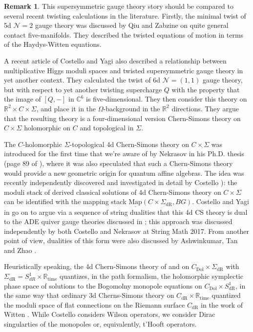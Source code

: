 \documentclass[11pt, oneside, reqno]{amsart}
\theoremstyle{definition} \newtheorem{definition}{Definition}[section]
\theoremstyle{definition} \newtheorem{remark}[definition]{Remark}
\theoremstyle{definition} \newtheorem{remarks}[definition]{Remarks}
\theoremstyle{definition} \newtheorem{question}[definition]{Question}
\theoremstyle{definition} \newtheorem*{note}{Note}
\theoremstyle{definition} \newtheorem{example}[definition]{Example}
\theoremstyle{definition} \newtheorem{examples}[definition]{Examples}
\newcommand{\mr}[1]{\mathrm{#1}}
\newcommand{\mc}[1]{\mathcal{#1}}
\newcommand{\ul}[1]{\underline{#1}}
\newcommand{\CC}{\mathbb{C}}
\newcommand{\RR}{\mathbb{R}}
\newcommand{\map}{\ul{\mr{Map}}}
\begin{document}
\begin{remark} \label{Kapustin_twist_remark}
This supersymmetric gauge theory story should be compared to several recent twisting calculations in the literature.  Firstly, the minimal twist of 5d $\mc N=2$ gauge theory was discussed by Qiu and Zabzine \cite{QiuZabzine} on quite general contact five-manifolds.  They described the twisted equations of motion in terms of the Haydys-Witten equations.

A recent article of Costello and Yagi \cite{CostelloYagi} also described a relationship between multiplicative Higgs moduli spaces and twisted supersymmetric gauge theory in yet another context.  They calculated the twist of 6d $\mc N=(1,1)$ gauge theory, but with respect to yet another twisting supercharge $Q$ with the property that the image of $[Q,-]$ in $\CC^6$ is five-dimensional.  They then consider this theory on $\RR^2 \times C \times \Sigma$, and place it in the $\Omega$-background in the $\RR^2$ directions.  They argue that the resulting theory is a four-dimensional version Chern-Simons theory on $C \times \Sigma$ holomorphic on $C$ and topological in $\Sigma$.

The $C$-holomorphic $\Sigma$-topological 4d Chern-Simons theory on $C \times \Sigma$  was introduced for the first time that we're aware of by Nekrasov in his Ph.D. thesis (page 89 of \cite{NekrasovThesis}), where it was also speculated that such a Chern-Simons theory
would provide a new geometric origin for quantum affine algebras. The idea was recently independently discovered and investigated in detail by Costello \cite{CostelloYangian}): the moduli stack of derived classical solutions of 4d Chern-Simons theory on $C \times \Sigma$ can be identified with the mapping stack $\map(C \times \Sigma_{\mr{dR}}, BG)$. Costello and Yagi in \cite{CostelloYagi} go on to argue via a sequence of string dualities that this 4d CS theory is dual to the ADE quiver gauge theories discussed in \cite{NekrasovPestun, NekrasovPestunShatashvili}; this approach was discussed independently by both Costello \cite{CostelloStringMath} and Nekrasov \cite{NekrasovStringMath} at String Math 2017.  From another point of view, dualities of this form were also discussed by Ashwinkumar, Tan and Zhao \cite{AshwinkumarTanZhao}.

Heuristically speaking, the 4d Chern-Simons theory of \cite{NekrasovThesis} and \cite{CostelloYangian} on $C_{\mathrm{Dol}} \times \Sigma_{\mathrm{dR}}$ with $\Sigma_{\mathrm{dR}} = S^{1}_{dR} \times \mathbb{R}_{\mathrm{time}}$ quantizes, in the path formalism, the holomorphic symplectic phase space of solutions to the Bogomolny monopole equations on $C_{\mathrm{Dol}} \times S^{1}_{\mathrm{dR}}$, in the same way that ordinary 3d Cherns-Simons theory on $C_{\mathrm{dR}} \times \mathbb{R}_{\mathrm{time}}$  quantized the moduli space
of flat connections on the Riemann surface $C_{\mathrm{dR}}$ in the work of Witten \cite{witten1989}.
While Costello \cite{CostelloYangian} considers Wilson operators,  we consider Dirac singularties of the monopoles or, equivalently, t'Hooft operators.
\end{remark}
\end{document}
